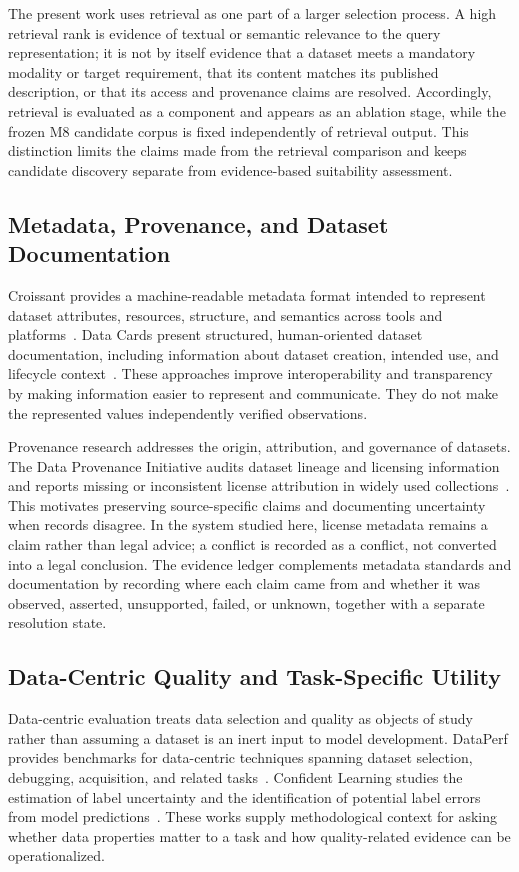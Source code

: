 \documentclass[conference]{IEEEtran}
\begin{document}
The present work uses retrieval as one part of a larger selection process. A high retrieval rank is evidence of textual or semantic relevance to the query representation; it is not by itself evidence that a dataset meets a mandatory modality or target requirement, that its content matches its published description, or that its access and provenance claims are resolved. Accordingly, retrieval is evaluated as a component and appears as an ablation stage, while the frozen M8 candidate corpus is fixed independently of retrieval output. This distinction limits the claims made from the retrieval comparison and keeps candidate discovery separate from evidence-based suitability assessment.

\subsection{Metadata, Provenance, and Dataset Documentation}
Croissant provides a machine-readable metadata format intended to represent dataset attributes, resources, structure, and semantics across tools and platforms~\cite{akhtar2024croissant}. Data Cards present structured, human-oriented dataset documentation, including information about dataset creation, intended use, and lifecycle context~\cite{pushkarna2022datacards}. These approaches improve interoperability and transparency by making information easier to represent and communicate. They do not make the represented values independently verified observations.

Provenance research addresses the origin, attribution, and governance of datasets. The Data Provenance Initiative audits dataset lineage and licensing information and reports missing or inconsistent license attribution in widely used collections~\cite{longpre2023dataprovenance}. This motivates preserving source-specific claims and documenting uncertainty when records disagree. In the system studied here, license metadata remains a claim rather than legal advice; a conflict is recorded as a conflict, not converted into a legal conclusion. The evidence ledger complements metadata standards and documentation by recording where each claim came from and whether it was observed, asserted, unsupported, failed, or unknown, together with a separate resolution state.

\subsection{Data-Centric Quality and Task-Specific Utility}
Data-centric evaluation treats data selection and quality as objects of study rather than assuming a dataset is an inert input to model development. DataPerf provides benchmarks for data-centric techniques spanning dataset selection, debugging, acquisition, and related tasks~\cite{mazumder2023dataperf}. Confident Learning studies the estimation of label uncertainty and the identification of potential label errors from model predictions~\cite{northcutt2021confident}. These works supply methodological context for asking whether data properties matter to a task and how quality-related evidence can be operationalized.
\end{document}
